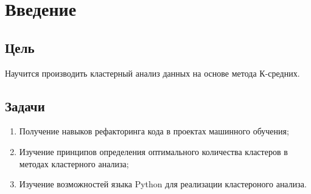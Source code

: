 \chapter{Введение}
\label{ch:intro}

\section{Цель}  

Научится производить кластерный анализ
данных на основе метода К-средних.

\section{Задачи} 

\begin{enumerate} 
\item Получение навыков рефакторинга кода в проектах машинного
обучения;
\item Изучение принципов определения оптимального количества кластеров
в методах кластерного анализа;
\item Изучение возможностей языка Python для реализации кластероного
анализа.
\end{enumerate}
  

\endinput 
